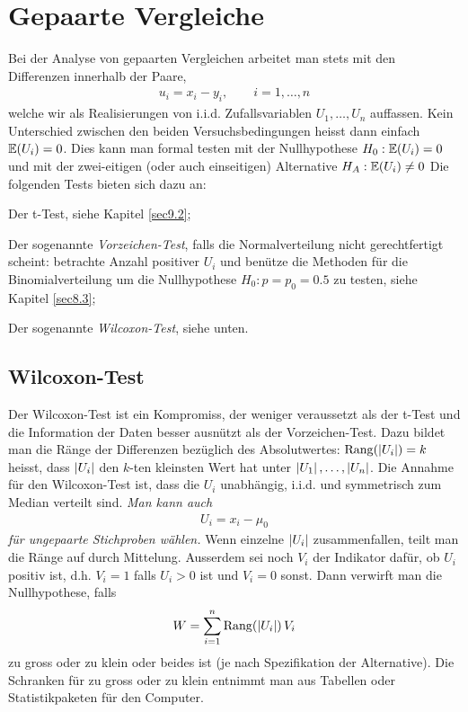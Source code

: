 \section{Gepaarte Vergleiche}
\label{sec11.2}
Bei der Analyse von gepaarten Vergleichen arbeitet man stets mit den Differenzen innerhalb der Paare,
\begin{gather*}
	u_i=x_i-y_i,\qquad i=1,\ldots,n
\end{gather*}
welche wir als Realisierungen von i.i.d. Zufallsvariablen $U_1,\ldots,U_n$ auffassen. Kein Unterschied zwischen den beiden Versuchsbedingungen heisst dann einfach $\operatorname{\mathbb E}(U_i)=0$. Dies kann man formal testen mit der Nullhypothese $H_0:\operatorname{\mathbb E}(U_i)=0$ und mit der zwei-eitigen (oder auch einseitigen) Alternative $H_A:\operatorname{\mathbb E}(U_i)\neq 0$ Die folgenden Tests bieten sich dazu an:
\begin{compactenum}[1.]
	\item Der t-Test, siehe Kapitel \ref{sec9.2};
	\item Der sogenannte \emph{Vorzeichen-Test}, falls die Normalverteilung nicht gerechtfertigt scheint: betrachte Anzahl positiver $U_i$ und benütze die Methoden für die Binomialverteilung um die Nullhypothese $H_0:p=p_0=0.5$ zu testen, siehe Kapitel \ref{sec8.3};
	\item Der sogenannte \emph{Wilcoxon-Test}, siehe unten.
\end{compactenum}
\subsection{Wilcoxon-Test}
Der Wilcoxon-Test ist ein Kompromiss, der weniger veraussetzt als der t-Test und die Information der Daten besser ausnützt als der Vorzeichen-Test. Dazu bildet man die Ränge der Differenzen bezüglich des Absolutwertes: $\operatorname{Rang}(\left\lvert U_i \right\rvert)=k$ heisst, dass $\left\lvert U_i \right\rvert$ den $k$-ten kleinsten Wert hat unter $\left\lvert U_1 \right\rvert,\ldots,\left\lvert U_n \right\rvert$. Die Annahme für den Wilcoxon-Test ist, dass die $U_i$ unabhängig, i.i.d. und symmetrisch zum Median verteilt sind. \emph{Man kann auch}
\begin{gather*}
	U_i=x_i-\mu_0
\end{gather*}
\emph{für ungepaarte Stichproben wählen.}
Wenn einzelne $\left\lvert U_i \right\rvert$ zusammenfallen, teilt man die Ränge auf durch Mittelung. Ausserdem sei noch $V_i$ der Indikator dafür, ob $U_i$ positiv ist, d.h. $V_i=1$ falls $U_i>0$ ist und $V_i=0$ sonst. Dann verwirft man die Nullhypothese, falls
\begin{gather*}
	W=\sum_{i=1}^{n}\operatorname{Rang}\!\left( \left\lvert U_i \right\rvert \right)V_i
\end{gather*}
zu gross oder zu klein oder beides ist (je nach Spezifikation der Alternative). Die Schranken für zu gross oder zu klein entnimmt man aus Tabellen oder Statistikpaketen für den Computer.


